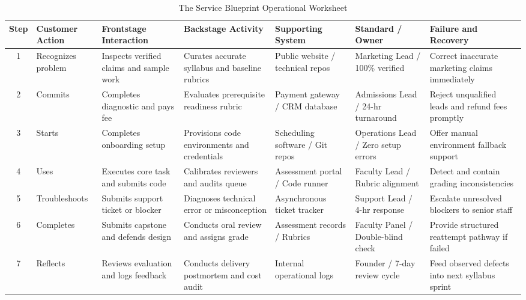 \begin{table}[t]
\centering
\footnotesize
\caption{The Service Blueprint Operational Worksheet}
\label{tab:service_blueprint_worksheet}
\begin{tabularx}{\textwidth}{c >{\raggedright\arraybackslash}p{} >{\raggedright\arraybackslash}p{} >{\raggedright\arraybackslash}p{} >{\raggedright\arraybackslash}p{} >{\raggedright\arraybackslash}p{} >{\raggedright\arraybackslash}X}
\toprule
Step & Customer Action & Frontstage Interaction & Backstage Activity & Supporting System & Standard / Owner & Failure and Recovery \\
\midrule
1 & Recognizes problem & Inspects verified claims and sample work & Curates accurate syllabus and baseline rubrics & Public website / technical repos & Marketing Lead / 100\% verified & Correct inaccurate marketing claims immediately \\
2 & Commits & Completes diagnostic and pays fee & Evaluates prerequisite readiness rubric & Payment gateway / CRM database & Admissions Lead / 24-hr turnaround & Reject unqualified leads and refund fees promptly \\
3 & Starts & Completes onboarding setup & Provisions code environments and credentials & Scheduling software / Git repos & Operations Lead / Zero setup errors & Offer manual environment fallback support \\
4 & Uses & Executes core task and submits code & Calibrates reviewers and audits queue & Assessment portal / Code runner & Faculty Lead / Rubric alignment & Detect and contain grading inconsistencies \\
5 & Troubleshoots & Submits support ticket or blocker & Diagnoses technical error or misconception & Asynchronous ticket tracker & Support Lead / 4-hr response & Escalate unresolved blockers to senior staff \\
6 & Completes & Submits capstone and defends design & Conducts oral review and assigns grade & Assessment records / Rubrics & Faculty Panel / Double-blind check & Provide structured reattempt pathway if failed \\
7 & Reflects & Reviews evaluation and logs feedback & Conducts delivery postmortem and cost audit & Internal operational logs & Founder / 7-day review cycle & Feed observed defects into next syllabus sprint \\
\bottomrule
\end{tabularx}
\end{table}

